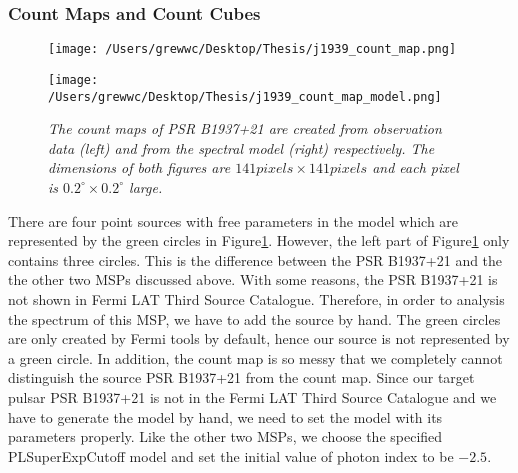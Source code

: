 \documentclass[12pt]{report}
\newcommand{\mycaption}[1]{\caption{\textit{\footnotesize #1}}}
\begin{document}
          \subsubsection{Count Maps and Count Cubes}
          \begin{figure}[!ht]
            \begin{center}
            \begin{minipage}{0.45\textwidth}
              \begin{center} 
                \texttt{[image: /Users/grewwc/Desktop/Thesis/j1939\_count\_map.png]}
              \end{center}
            \end{minipage}
            \begin{minipage}{0.45\textwidth}
              \begin{center}
                \texttt{[image: /Users/grewwc/Desktop/Thesis/j1939\_count\_map\_model.png]}
              \end{center}
            \end{minipage}
          \end{center}
          \mycaption{The count maps of PSR B1937+21 are created from observation 
            data (\textsf{left}) and from the spectral model (\textsf{right}) respectively. 
            The dimensions of both figures are $141 pixels \times 141 pixels$ and each pixel is 
            $0.2^{\circ}\times0.2^{\circ}$ large.}
            \label{fig: j1939_count_map}
          \end{figure}
          \vspace{1cm}

          There are four point sources with free parameters in the model which are represented by the green 
          circles in Figure\ref{fig: j1939_count_map}.
          However, the left part of Figure\ref{fig: j1939_count_map} only contains three circles.
          This is the difference between the PSR B1937+21 and the the other two MSPs discussed 
          above. With some reasons, the PSR B1937+21 is not shown in Fermi LAT Third Source Catalogue.
          Therefore, in order to analysis the spectrum of this MSP, we have to add the source 
          by hand. The green circles are only created by Fermi tools by default, hence our source is 
          not represented by a green circle. In addition, the count map is so messy that we completely 
          cannot distinguish the source PSR B1937+21 from the count map. 
          Since our target pulsar PSR B1937+21 is not in the Fermi LAT Third Source Catalogue and 
          we have to generate the model by hand, we need to set the model with its parameters properly.
          Like the other two MSPs, we choose the specified PLSuperExpCutoff model and set the initial value 
          of photon index to be $-2.5$.
\end{document}
